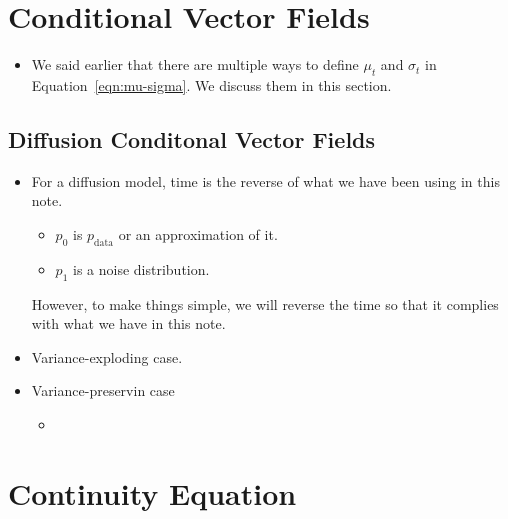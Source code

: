 \documentclass[10pt]{article}
\newcommand{\mcal}[1]{\mathcal{#1}}
\newcommand{\data}{\mathrm{data}}
\begin{document}
\section{Conditional Vector Fields}

\begin{itemize}
  \item We said earlier that there are multiple ways to define $\mu_t$ and $\sigma_t$ in Equation~\eqref{eqn:mu-sigma}. We discuss them in this section.
\end{itemize}

\subsection{Diffusion Conditonal Vector Fields}

\begin{itemize}
  \item For a diffusion model, time is the reverse of what we have been using in this note.
  \begin{itemize}
    \item $p_0$ is $p_{\data}$ or an approximation of it.
    \item $p_1$ is a noise distribution.
  \end{itemize}
  However, to make things simple, we will reverse the time so that it complies with what we have in this note.

  \item Variance-exploding case.

  \item Variance-preservin case
  \begin{itemize}
    \item 
  \end{itemize}
\end{itemize}

\appendix

\section{Continuity Equation}
\end{document}
